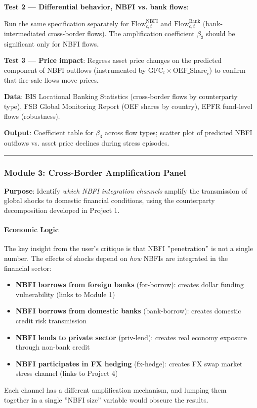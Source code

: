 \documentclass[11pt,a4paper]{article}
\begin{document}
\textbf{Test 2 --- Differential behavior, NBFI vs. bank flows}:

Run the same specification separately for $\text{Flow}_{c,t}^{\text{NBFI}}$ and $\text{Flow}_{c,t}^{\text{Bank}}$ (bank-intermediated cross-border flows). The amplification coefficient $\beta_3$ should be significant only for NBFI flows.

\textbf{Test 3 --- Price impact}: Regress asset price changes on the predicted component of NBFI outflows (instrumented by $\text{GFC}_t \times \text{OEF\_Share}_{c}$) to confirm that fire-sale flows move prices.

\textbf{Data}: BIS Locational Banking Statistics (cross-border flows by counterparty type), FSB Global Monitoring Report (OEF shares by country), EPFR fund-level flows (robustness).

\textbf{Output}: Coefficient table for $\beta_3$ across flow types; scatter plot of predicted NBFI outflows vs. asset price declines during stress episodes.


\bigskip\noindent\rule{\textwidth}{0.4pt}\bigskip


\subsubsection{Module 3: Cross-Border Amplification Panel}

\textbf{Purpose}: Identify \textit{which NBFI integration channels} amplify the transmission of global shocks to domestic financial conditions, using the counterparty decomposition developed in Project 1.


\paragraph{Economic Logic}

The key insight from the user's critique is that NBFI ''penetration'' is not a single number. The effects of shocks depend on \textit{how} NBFIs are integrated in the financial sector:

\begin{itemize}
\item \textbf{NBFI borrows from foreign banks} (for-borrow): creates dollar funding vulnerability (links to Module 1)
\item \textbf{NBFI borrows from domestic banks} (bank-borrow): creates domestic credit risk transmission
\item \textbf{NBFI lends to private sector} (priv-lend): creates real economy exposure through non-bank credit
\item \textbf{NBFI participates in FX hedging} (fx-hedge): creates FX swap market stress channel (links to Project 4)

\end{itemize}
Each channel has a different amplification mechanism, and lumping them together in a single ''NBFI size'' variable would obscure the results.
\end{document}
